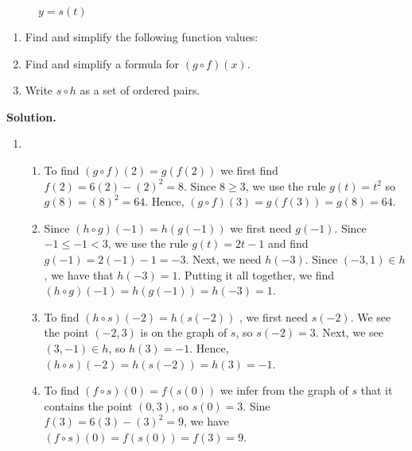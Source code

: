 \begin{ex}
\begin{figure}
\begin{center}
\caption{$y = s(t)$}
\label{fig:yeqstfcompex3}
\end{center}
\end{figure}
\begin{enumerate}

\item  Find and simplify the following function values:


\item  Find and simplify a formula for $(g \circ f)(x)$.

\item  Write $s \circ h$ as a set of ordered pairs.

\end{enumerate}

{\bf Solution.}

\begin{enumerate}

\item  \begin{enumerate} \item To find $(g \circ f)(2) = g(f(2))$ we first find $f(2) = 6(2)-(2)^2 = 8$.  Since $8 \geq 3$, we use the rule $g(t) = t^2$ so $g(8) = (8)^2 = 64$.  Hence, $(g \circ f)(3) = g(f(3)) = g(8) = 64$.

\item Since  $(h\circ g)(-1) = h(g(-1))$ we first need $g(-1)$.  Since $-1 \leq -1 < 3$, we use the rule $g(t) = 2t-1$ and find $g(-1) = 2(-1)-1 = -3$. Next, we need $h(-3)$.  Since  $(-3, 1) \in h$, we have that $h(-3) =1$.  Putting it all together, we find $(h\circ g)(-1)  = h(g(-1)) = h(-3) = 1$.

\item To find  $(h \circ s)(-2) = h(s(-2))$ , we first need $s(-2)$.  We see the point $(-2,3)$ is on the graph of $s$, so $s(-2) = 3$.  Next, we see $(3,-1) \in h$, so $h(3) = -1$.  Hence,  $(h \circ s)(-2) = h(s(-2)) = h(3) = -1$.

\item  To find $(f \circ s)(0) = f(s(0))$ we infer from the graph of $s$ that it contains the point $(0,3)$, so $s(0) = 3$. Sine $f(3) = 6(3) - (3)^2 = 9$, we have $(f \circ s)(0) = f(s(0)) = f(3) = 9$.



\end{enumerate}
\end{enumerate}
\end{ex}

